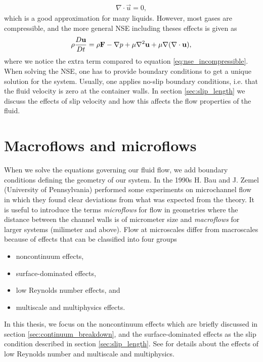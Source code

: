 \begin{align}
	\nabla\cdot \vec u = 0,
\end{align}
which is a good approximation for many liquids. However, most gases are compressible, and the more general NSE including theses effects is given as
\begin{align}
	\rho {D\vec u\over Dt} = \rho \vec F - \nabla p + \mu\nabla^2\vec u + \mu\nabla(\nabla\cdot \vec u),
\end{align}
where we notice the extra term compared to equation \eqref{eq:nse_incompressible}. When solving the NSE, one has to provide boundary conditions to get a unique solution for the system. Usually, one applies no-slip boundary conditions, i.e. that the fluid velocity is zero at the container walls. In section \ref{sec:slip_length} we discuss the effects of slip velocity and how this affects the flow properties of the fluid. 
\section{Macroflows and microflows}
When we solve the equations governing our fluid flow, we add boundary conditions defining the geometry of our system. In the 1990s H. Bau and J. Zemel (University of Pennsylvania) performed some experiments on microchannel flow in which they found clear deviations from what was expected from the theory\cite{karniadakis2005microflows}. It is useful to introduce the terms \textit{microflows} for flow in geometries where the distance between the channel walls is of micrometer size and \textit{macroflows} for larger systems (milimeter and above). Flow at microscales differ from macroscales because of effects that can be classified into four groups
\begin{itemize}
\item noncontinuum effects,
\item surface-dominated effects,
\item low Reynolds number effects, and
\item multiscale and multiphysics effects.
\end{itemize}
In this thesis, we focus on the noncontinuum effects which are briefly discussed in section \ref{sec:continuum_breakdown}, and the surface-dominated effects as the slip condition described in section \ref{sec:slip_length}. See \cite{karniadakis2005microflows} for details about the effects of low Reynolds number and multiscale and multiphysics. 

